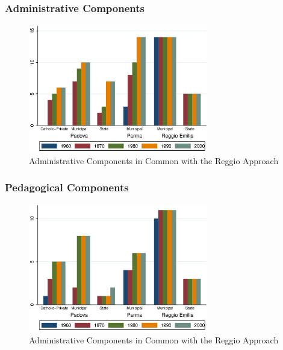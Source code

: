 \documentclass[static]{JJH-Beamer_PAGENOS}
\begin{document}
\begin{frame}
\frametitle{Administrative Components}
\centering
\begin{figure}[H]
\caption{Administrative Components in Common with the Reggio Approach}
\includegraphics[width=0.7\textwidth]{../../output/aggregateAdministrative.eps}
\end{figure}
\end{frame}


\begin{frame}
\frametitle{Pedagogical Components}
\centering
\begin{figure}[H]
\caption{Administrative Components in Common with the Reggio Approach}
\includegraphics[width=0.7\textwidth]{../../output/aggregatePedagogical.eps}
\end{figure}
\end{frame}

\end{document}

